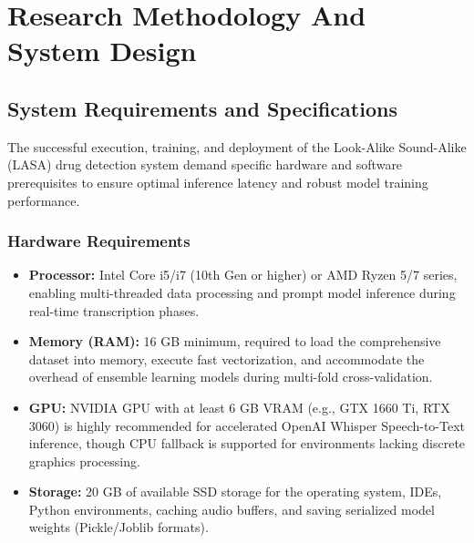 \documentclass[12pt,a4paper]{report}
\begin{document}
\chapter{Research Methodology And System Design}

\section{System Requirements and Specifications}
The successful execution, training, and deployment of the Look-Alike Sound-Alike (LASA) drug detection system demand specific hardware and software prerequisites to ensure optimal inference latency and robust model training performance. 

\subsection{Hardware Requirements}
\begin{itemize}
    \item \textbf{Processor:} Intel Core i5/i7 (10th Gen or higher) or AMD Ryzen 5/7 series, enabling multi-threaded data processing and prompt model inference during real-time transcription phases.
    \item \textbf{Memory (RAM):} 16 GB minimum, required to load the comprehensive dataset into memory, execute fast vectorization, and accommodate the overhead of ensemble learning models during multi-fold cross-validation.
    \item \textbf{GPU:} NVIDIA GPU with at least 6 GB VRAM (e.g., GTX 1660 Ti, RTX 3060) is highly recommended for accelerated OpenAI Whisper Speech-to-Text inference, though CPU fallback is supported for environments lacking discrete graphics processing.
    \item \textbf{Storage:} 20 GB of available SSD storage for the operating system, IDEs, Python environments, caching audio buffers, and saving serialized model weights (Pickle/Joblib formats).
\end{itemize}
\end{document}
